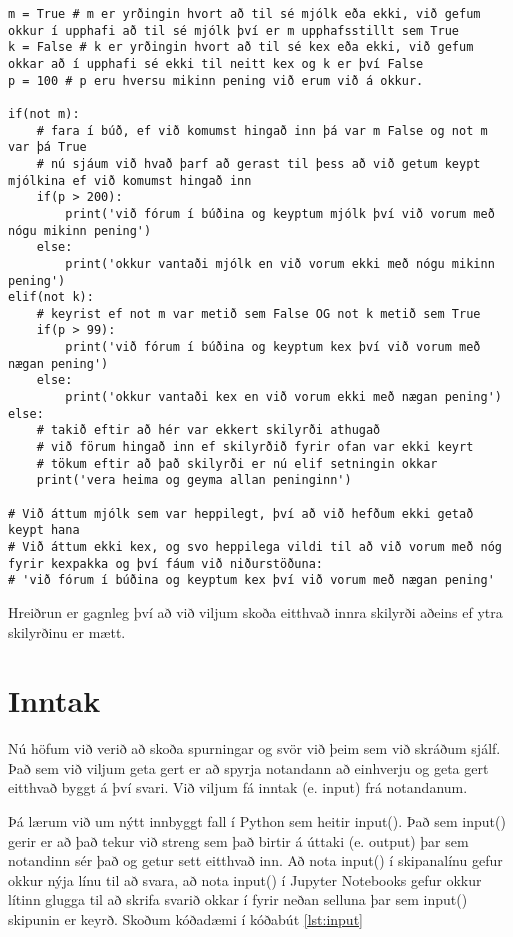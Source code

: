 \begin{lstlisting}[caption=Hreiðrun, label=lst:nesting]
m = True # m er yrðingin hvort að til sé mjólk eða ekki, við gefum okkur í upphafi að til sé mjólk því er m upphafsstillt sem True
k = False # k er yrðingin hvort að til sé kex eða ekki, við gefum okkar að í upphafi sé ekki til neitt kex og k er því False
p = 100 # p eru hversu mikinn pening við erum við á okkur.

if(not m):
	# fara í búð, ef við komumst hingað inn þá var m False og not m var þá True
	# nú sjáum við hvað þarf að gerast til þess að við getum keypt mjólkina ef við komumst hingað inn
	if(p > 200):
		print('við fórum í búðina og keyptum mjólk því við vorum með nógu mikinn pening')
	else:
		print('okkur vantaði mjólk en við vorum ekki með nógu mikinn pening')
elif(not k):
	# keyrist ef not m var metið sem False OG not k metið sem True
	if(p > 99):
		print('við fórum í búðina og keyptum kex því við vorum með nægan pening')
	else:
		print('okkur vantaði kex en við vorum ekki með nægan pening')
else:
	# takið eftir að hér var ekkert skilyrði athugað
	# við förum hingað inn ef skilyrðið fyrir ofan var ekki keyrt
	# tökum eftir að það skilyrði er nú elif setningin okkar
	print('vera heima og geyma allan peninginn')

# Við áttum mjólk sem var heppilegt, því að við hefðum ekki getað keypt hana
# Við áttum ekki kex, og svo heppilega vildi til að við vorum með nóg fyrir kexpakka og því fáum við niðurstöðuna:
# 'við fórum í búðina og keyptum kex því við vorum með nægan pening'
\end{lstlisting}

Hreiðrun er gagnleg því að við viljum skoða eitthvað innra skilyrði aðeins ef ytra skilyrðinu er mætt.

\section{Inntak}
Nú höfum við verið að skoða spurningar og svör við þeim sem við skráðum sjálf.
Það sem við viljum geta gert er að spyrja notandann að einhverju og geta gert eitthvað byggt á því svari.
Við viljum fá inntak (e. input) frá notandanum.

Þá lærum við um nýtt innbyggt fall í Python sem heitir input().
Það sem input() gerir er að það tekur við streng sem það birtir á úttaki (e. output) þar sem notandinn sér það og getur sett eitthvað inn.
Að nota input() í skipanalínu gefur okkur nýja línu til að svara, að nota input() í Jupyter Notebooks gefur okkur lítinn glugga til að skrifa svarið okkar í fyrir neðan selluna þar sem input() skipunin er keyrð.
Skoðum kóðadæmi í kóðabút \ref{lst:input}